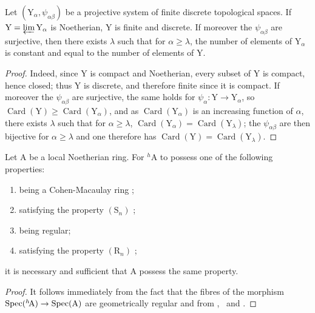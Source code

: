 \begin{lemma}[18.6.9.2]
\label{IV.18.6.9.2}
Let $(\mathrm{Y}_\alpha,\psi_{\alpha\beta})$ be a projective system of finite discrete topological spaces.
If $\mathrm{Y}=\varprojlim\mathrm{Y}_\alpha$ is Noetherian, Y is finite and discrete.
If moreover the $\psi_{\alpha\beta}$ are surjective, then there exists $\lambda$ such that for $\alpha\geq\lambda$, the number of elements of $\mathrm{Y}_\alpha$ is constant and equal to the number of elements of $\mathrm{Y}$.
\end{lemma}

\begin{proof}
Indeed, since Y is compact and Noetherian, every subset of Y is compact, hence closed; thus Y is discrete, and therefore finite since it is compact.
If moreover the $\psi_{\alpha\beta}$ are surjective, the same holds for $\psi_\alpha:\mathrm{Y}\to\mathrm{Y}_\alpha$, so $\operatorname{Card}(\mathrm{Y})\geq\operatorname{Card}(\mathrm{Y}_\alpha)$, and as $\operatorname{Card}(\mathrm{Y}_\alpha)$ is an increasing function of $\alpha$, there exists $\lambda$ such that for $\alpha\geq\lambda$, $\operatorname{Card}(\mathrm{Y}_\alpha)=\operatorname{Card}(\mathrm{Y}_\lambda)$;
the $\psi_{\alpha\beta}$ are then bijective for $\alpha\geq\lambda$ and one therefore has $\operatorname{Card}(\mathrm{Y})=\operatorname{Card}(\mathrm{Y}_\lambda)$.
\end{proof}

\begin{corollary}[18.6.10]
\label{IV.18.6.10}
Let $\mathrm{A}$ be a local Noetherian ring.
For ${}^h\!\mathrm{A}$ to possess one of the following properties:
\begin{enumerate}[label=\emph{\alph*)}]
  \item being a Cohen-Macaulay ring ;
  \item satisfying the property $(\mathrm{S}_n)$ ;
  \item being regular;
  \item satisfying the property $(\mathrm{R}_n)$ ;
\end{enumerate}
it is necessary and sufficient that A possess the same property.
\end{corollary}

\begin{proof}
It follows immediately from the fact that the fibres of the morphism $\operatorname{Spec}({}^h\!\mathrm{A})\to\operatorname{Spec}(\mathrm{A})$ are geometrically regular  and from ,~ and .
\end{proof}

